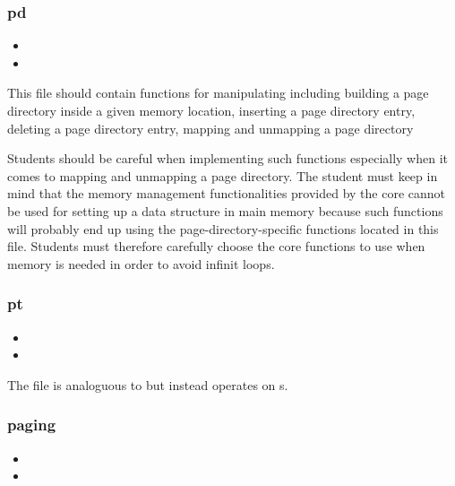 \subsubsection*{pd}

\begin{itemize}
  \item
  \item
\end{itemize}

This file should contain functions for manipulating  including building a page directory inside a given memory
location, inserting a page directory entry, deleting a page directory
entry, mapping and unmapping a page directory \etc{}

Students should be careful when implementing such functions especially when
it comes to mapping and unmapping a page directory. The student must keep
in mind that the memory management functionalities provided by the core
cannot be used for setting up a data structure in main memory because such
functions will probably end up using the page-directory-specific functions
located in this file. Students must therefore carefully choose the core
functions to use when memory is needed in order to avoid infinit loops.

\subsubsection*{pt}

\begin{itemize}
  \item
  \item
\end{itemize}

The file  is analoguous to  but instead operates
on s.

\subsubsection*{paging}

\begin{itemize}
  \item
  \item
\end{itemize}

